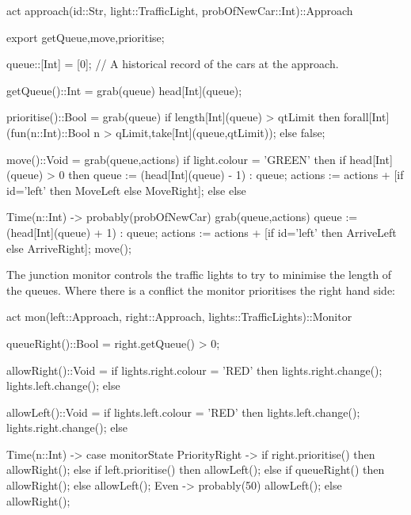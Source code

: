 \documentclass[5p,times]{elsarticle}
\begin{document}
\begin{ESL}
act approach(id::Str,
             light::TrafficLight,
             probOfNewCar::Int)::Approach {

  export getQueue,move,prioritise;

  queue::[Int] = [0];   // A historical record of the cars at the approach.
  
  getQueue()::Int =
    grab(queue) {
      head[Int](queue);
    }
    
  prioritise()::Bool =
    grab(queue) {
      if length[Int](queue) > qtLimit
      then forall[Int](fun(n::Int)::Bool 
             n > qLimit,take[Int](queue,qtLimit));
      else false;
    }
    
  move()::Void =
    grab(queue,actions) {
      if light.colour = 'GREEN'
      then 
        if head[Int](queue) > 0
        then {
          queue := (head[Int](queue) - 1) : queue;
          actions := actions + 
            [if id='left' then MoveLeft else MoveRight];
        } else {}
      else {}
    }
  
  Time(n::Int) -> {
    probably(probOfNewCar) { 
      grab(queue,actions) { 
        queue := (head[Int](queue) + 1) : queue;
        actions := actions + 
          [if id='left' then ArriveLeft else ArriveRight];
      }
    }
    move();
  }
}
\end{ESL}
The junction monitor controls the traffic lights to try to minimise the length of the queues. Where there is a conflict the monitor prioritises the right hand side:
\begin{ESL}
act mon(left::Approach,
        right::Approach,
        lights::TrafficLights)::Monitor {

  queueRight()::Bool = right.getQueue() > 0;
  
  allowRight()::Void = 
    if lights.right.colour = 'RED' 
    then {
      lights.right.change();
      lights.left.change();
    } else {}
    
  allowLeft()::Void = 
    if lights.left.colour = 'RED' 
    then {
      lights.left.change();
      lights.right.change();
    } else {}
  
  Time(n::Int) -> 
    case monitorState {
      PriorityRight ->
        if right.prioritise()
        then allowRight();
        else 
          if left.prioritise()
          then allowLeft();
          else
            if queueRight()
            then allowRight();
            else allowLeft();
      Even -> probably(50) allowLeft(); else allowRight();
    }
}
\end{ESL}
\end{document}
